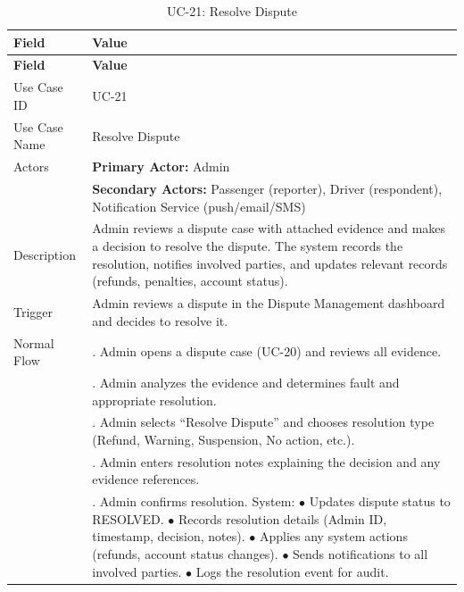 \begin{longtable}{|>{\raggedright\arraybackslash}p{4cm}|>{\raggedright\arraybackslash}p{11cm}|}
\caption{UC-21: Resolve Dispute}
\label{tab:uc-21} \\
\hline
\rowcolor{lightgray!30}
\textbf{Field} & \textbf{Value} \\
\hline
\endfirsthead
\hline
\rowcolor{lightgray!30}
\textbf{Field} & \textbf{Value} \\
\hline
\endhead
\hline
\endfoot
\hline
\endlastfoot
Use Case ID & UC-21 \\
\hline
Use Case Name & Resolve Dispute \\
\hline
Actors & \textbf{Primary Actor:} Admin \\
& \textbf{Secondary Actors:} Passenger (reporter), Driver (respondent), Notification Service (push/email/SMS) \\
\hline
Description & Admin reviews a dispute case with attached evidence and makes a decision to resolve the dispute. The system records the resolution, notifies involved parties, and updates relevant records (refunds, penalties, account status). \\
\hline
Trigger & Admin reviews a dispute in the Dispute Management dashboard and decides to resolve it. \\
\hline
Normal Flow & 1. Admin opens a dispute case (UC-20) and reviews all evidence. \\
& 2. Admin analyzes the evidence and determines fault and appropriate resolution. \\
& 3. Admin selects ``Resolve Dispute'' and chooses resolution type (Refund, Warning, Suspension, No action, etc.). \\
& 4. Admin enters resolution notes explaining the decision and any evidence references. \\
& 5. Admin confirms resolution. System: \newline $\bullet$ Updates dispute status to RESOLVED. \newline $\bullet$ Records resolution details (Admin ID, timestamp, decision, notes). \newline $\bullet$ Applies any system actions (refunds, account status changes). \newline $\bullet$ Sends notifications to all involved parties. \newline $\bullet$ Logs the resolution event for audit. \\

\end{longtable}
